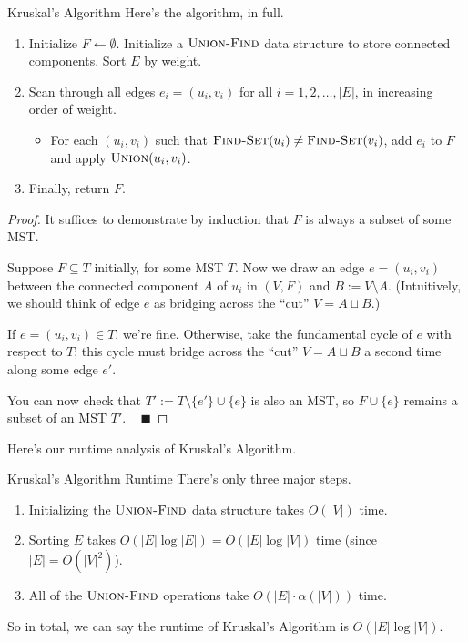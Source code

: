 \begin{solution}{Kruskal's Algorithm}
    Here's the algorithm, in full.
    \begin{enumerate}
        \item Initialize $F \leftarrow \emptyset$.  Initialize a $\textsc{Union-Find}$ data structure to store connected components.  Sort $E$ by weight.
        \item Scan through all edges $e_i = (u_i, v_i)$ for all $i = 1, 2, \dots, |E|$, in increasing order of weight.
        \begin{itemize}
            \item For each $(u_i, v_i)$ such that $\textsc{Find-Set}(u_i) \neq \textsc{Find-Set}(v_i)$, add $e_i$ to $F$ and apply $\textsc{Union}(u_i, v_i)$.
        \end{itemize}
        \item Finally, return $F$.
    \end{enumerate}
\end{solution}

\begin{proof}
    It suffices to demonstrate by induction that $F$ is always a subset of some MST.

    Suppose $F \subseteq T$ initially, for some MST $T$.  Now we draw an edge $e = (u_i, v_i)$ between the connected component $A$ of $u_i$ in $(V, F)$ and $B := V \setminus A$.  (Intuitively, we should think of edge $e$ as bridging across the ``cut'' $V = A \sqcup B$.)

    If $e = (u_i, v_i) \in T$, we're fine.  Otherwise, take the fundamental cycle of $e$ with respect to $T$; this cycle must bridge across the ``cut'' $V = A \sqcup B$ a second time along some edge $e'$.

    You can now check that $T' := T \setminus \{e'\} \cup \{e\}$ is also an MST, so $F \cup \{e\}$ remains a subset of an MST $T'$. ~ $\blacksquare$
\end{proof}

Here's our runtime analysis of Kruskal's Algorithm.

\begin{solution}{Kruskal's Algorithm Runtime}
There's only three major steps.
    \begin{enumerate}
        \item Initializing the $\textsc{Union-Find}$ data structure takes $O(|V|)$ time.
        \item Sorting $E$ takes $O(|E| \log |E|) = O(|E| \log |V|)$ time (since $|E| = O(|V|^2)$).
        \item All of the $\textsc{Union-Find}$ operations take $O(|E| \cdot \alpha(|V|))$ time.
    \end{enumerate}
So in total, we can say the runtime of Kruskal's Algorithm is $O(|E| \log |V|)$.
\end{solution}

